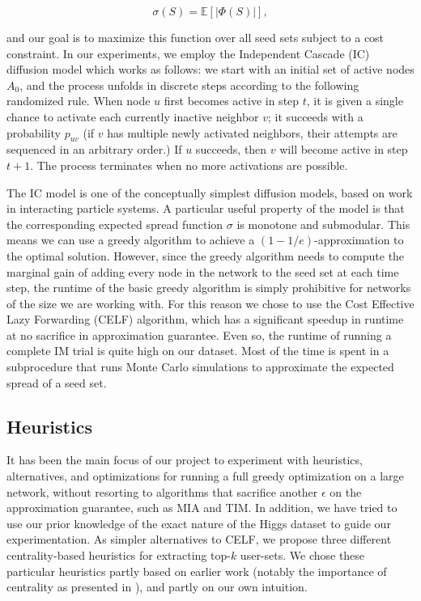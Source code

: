 \documentclass[sigconf]{acmart}
\begin{document}
\begin{equation}
\sigma(S) = \mathbb{E}\left[ |\Phi(S)| \right],
\end{equation}

and our goal is to maximize this function over all seed sets subject to a cost constraint. In our experiments, we employ the Independent Cascade (IC) diffusion model which works as follows: we start with an initial set of active nodes $A_0$, and the process unfolds in discrete steps according to the following randomized rule. When node $u$ first becomes active in step $t$, it is given a single chance to activate each currently inactive neighbor $v$; it succeeds with a probability $p_{uv}$ (if $v$ has multiple newly activated neighbors, their attempts are sequenced in an arbitrary order.) If $u$ succeeds, then $v$ will become active in step $t + 1$. The process terminates when no more activations are possible.

The IC model is one of the conceptually simplest diffusion models, based on work in interacting particle systems. A particular useful property of the model is that the corresponding expected spread function $\sigma$ is monotone and submodular. This means we can use a greedy algorithm to achieve a $(1 - 1/e)$-approximation to the optimal solution. However, since the greedy algorithm needs to compute the marginal gain of adding every node in the network to the seed set at each time step, the runtime of the basic greedy algorithm is simply prohibitive for networks of the size we are working with. For this reason we chose to use the Cost Effective Lazy Forwarding (CELF) algorithm, which has a significant speedup in runtime at no sacrifice in approximation guarantee. Even so, the runtime of running a complete IM trial is quite high on our dataset. Most of the time is spent in a subprocedure that runs Monte Carlo simulations to approximate the expected spread of a seed set. 

\subsection{Heuristics}

It has been the main focus of our project to experiment with heuristics, alternatives, and optimizations for running a full greedy optimization on a large network, without resorting to algorithms that sacrifice another $\epsilon$ on the approximation guarantee, such as MIA and TIM. In addition, we have tried to use our prior knowledge of the exact nature of the Higgs dataset to guide our experimentation. As simpler alternatives to CELF, we propose three different centrality-based heuristics for extracting top-$k$ user-sets. We chose these particular heuristics partly based on earlier work (notably the importance of centrality as presented in \cite{goyal2010learning}), and partly on our own intuition.
\end{document}
